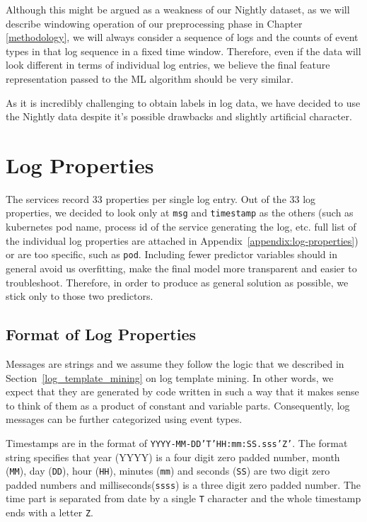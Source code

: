 Although this might be argued as a weakness of our Nightly dataset, as we will describe windowing operation of our preprocessing phase in Chapter \ref{methodology}, we will always consider a sequence of logs and the counts of event types in that log sequence in a fixed time window. Therefore, even if the data will look different in terms of individual log entries, we believe the final feature representation passed to the ML algorithm should be very similar.   

As it is incredibly challenging to obtain labels in log data, we have decided to use the Nightly data despite it's possible drawbacks and slightly artificial character.

\section{Log Properties}
The services record 33 properties per single log entry. Out of the 33 log properties, we decided to look only at \texttt{msg} and \texttt{timestamp} as the others (such as kubernetes pod name, process id of the service generating the log, etc. full list of the individual log properties are attached in Appendix~\ref{appendix:log-properties}) or are too specific, such as \texttt{pod}.
Including fewer predictor variables should in general avoid us overfitting, make the final model more transparent and easier to troubleshoot.
Therefore, in order to produce as general solution as possible, we stick only to those two predictors.

\subsection{Format of Log Properties}
Messages are strings and we assume they follow the logic that we described in Section~\ref{log_template_mining} on log template mining. In other words, we expect that they are generated by code written in such a way that it makes sense to think of them as a product of constant and variable parts. Consequently, log messages can be further categorized using event types.

Timestamps are in the format of \texttt{YYYY-MM-DD'T'HH:mm:SS.sss'Z'}. The format string specifies that year (YYYY) is a four digit zero padded number, month (\texttt{MM}), day (\texttt{DD}), hour (\texttt{HH}), minutes (\texttt{mm}) and seconds (\texttt{SS}) are two digit zero padded numbers and milliseconds(\texttt{ssss}) is a three digit zero padded number. The time part is separated from date by a single \texttt{T} character and the whole timestamp ends with a letter \texttt{Z}.


